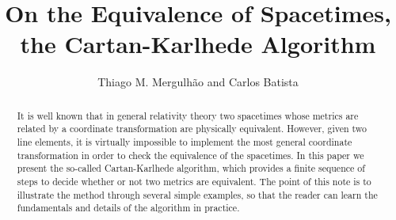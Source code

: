 \documentclass[twocolumn,prd,aps,showpacs,showkeys,amsmath,amssymb]{revtex4-1}
\begin{document}
\title{On the Equivalence of Spacetimes, the Cartan-Karlhede Algorithm}
\author{Thiago M. Mergulh\~{a}o and Carlos Batista}


\begin{abstract}
It is well known that in general relativity theory two spacetimes whose metrics are related by a coordinate transformation are physically equivalent. However, given two line elements, it is virtually impossible to implement the most general coordinate transformation in order to check the equivalence of the spacetimes. In this paper we present the so-called Cartan-Karlhede algorithm, which provides a finite sequence of steps to decide whether or not two metrics are equivalent. The point of this note is to illustrate the method through several simple examples, so that the reader can learn the fundamentals and details of the algorithm in practice.
\end{abstract}
\maketitle
\end{document}

